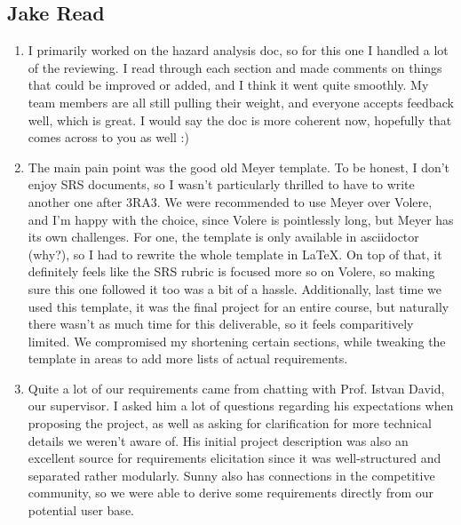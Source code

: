 \documentclass{article}
\begin{document}
\subsection*{Jake Read}\label{subsec:jake-read}
\begin{enumerate}
    \item I primarily worked on the hazard analysis doc, so for this one I handled a lot of the reviewing.
    I read through each section and made comments on things that could be improved or added, and I think it went quite smoothly.
    My team members are all still pulling their weight, and everyone accepts feedback well, which is great.
    I would say the doc is more coherent now, hopefully that comes across to you as well :)

    \item The main pain point was the good old Meyer template.
    To be honest, I don't enjoy SRS documents, so I wasn't particularly thrilled to have to write another one after 3RA3.
    We were recommended to use Meyer over Volere, and I'm happy with the choice, since Volere is pointlessly long, but Meyer has its own challenges.
    For one, the template is only available in asciidoctor (why?), so I had to rewrite the whole template in LaTeX\@.
    On top of that, it definitely feels like the SRS rubric is focused more so on Volere, so making sure this one followed it too was a bit of a hassle.
    Additionally, last time we used this template, it was the final project for an entire course, but naturally there wasn't as much time for this deliverable, so it feels comparitively limited.
    We compromised my shortening certain sections, while tweaking the template in areas to add more lists of actual requirements.

    \item Quite a lot of our requirements came from chatting with Prof. Istvan David, our supervisor.
    I asked him a lot of questions regarding his expectations when proposing the project, as well as asking for clarification for more technical details we weren't aware of.
    His initial project description was also an excellent source for requirements elicitation since it was well-structured and separated rather modularly.
    Sunny also has connections in the \emph{\Catan{}} competitive community, so we were able to derive some requirements directly from our potential user base.


\end{enumerate}
\end{document}
